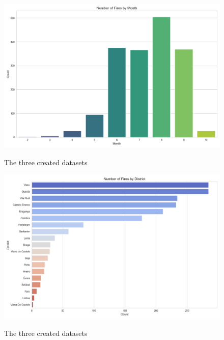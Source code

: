 \begin{figure}[H]
	\caption{The three created datasets}
	\centering
	\includegraphics[width=\textwidth]{chapter-images/5_1-eda/monthly_fire_count.png}
	\label{fig:montly_fire_count}
\end{figure}



\begin{figure}[H]
	\caption{The three created datasets}
	\centering
	\includegraphics[width=\textwidth]{chapter-images/5_1-eda/district_fire_count.png}
	\label{fig:montly_fire_count}
\end{figure}


